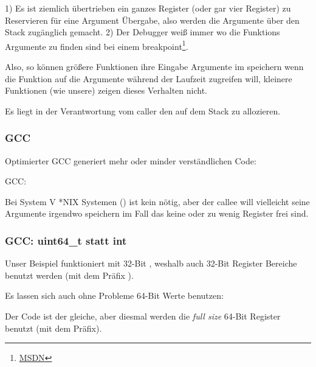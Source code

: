 1) Es ist ziemlich übertrieben ein ganzes Register (oder gar vier Register) zu Reservieren für eine
Argument Übergabe, also werden die Argumente über den Stack zugänglich gemacht.
2) Der Debugger weiß immer wo die Funktions Argumente zu finden sind bei einem breakpoint\footnote{\href{http://msdn.microsoft.com/en-us/library/ew5tede7(v=VS.90).aspx}{MSDN}}.


Also, so können größere Funktionen ihre Eingabe Argumente im  speichern wenn die Funktion
auf die Argumente während der Laufzeit zugreifen will, kleinere Funktionen (wie unsere) zeigen dieses Verhalten 
nicht. 

Es liegt in der Verantwortung vom \gls{caller} den  auf dem Stack zu allozieren.

\subsubsection{GCC}

Optimierter GCC generiert mehr oder minder verständlichen Code:



\NonOptimizing GCC:




Bei System V *NIX Systemen (\SysVABI) ist kein  nötig, aber der \gls{callee} will vielleicht
seine Argumente irgendwo speichern im Fall das keine oder zu wenig Register frei sind.

\subsubsection{GCC: uint64\_t statt int}

Unser Beispiel funktioniert mit 32-Bit \Tint, weshalb auch 32-Bit Register Bereiche benutzt werden (mit dem Präfix ).

Es lassen sich auch ohne Probleme 64-Bit Werte benutzen:





Der Code ist der gleiche, aber diesmal werden die \emph{full size} 64-Bit Register benutzt (mit dem  Präfix).

